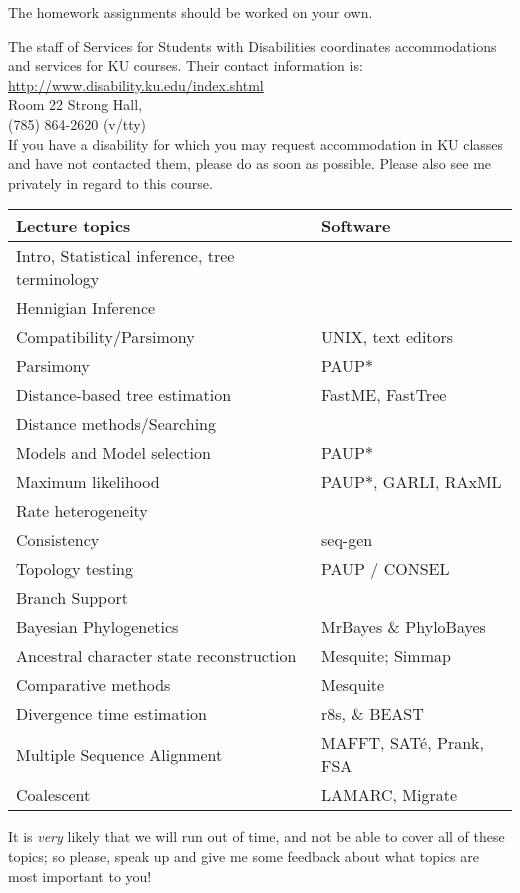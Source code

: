 \documentclass[11pt]{article}
\begin{document}
The homework assignments should be worked on your own. 

\newpage
{}\par
The staff of Services for Students with Disabilities coordinates accommodations and services for KU courses. Their contact information is:\\ 
\url{http://www.disability.ku.edu/index.shtml}\\
Room 22 Strong Hall,  \\
(785) 864-2620 (v/tty) \\ 
If you have a disability for which you may request accommodation in KU classes and have not contacted them, please do as soon as possible. 
Please also see me privately in regard to this course. 
 
\begin{table}[h]
\begin{center}
\begin{tabular}{|l|p{1.9in}|}
\hline
 {\bf Lecture topics} & {\bf Software} \\
\hline
Intro,  Statistical inference, tree terminology & \\
\hline
Hennigian Inference & \\
\hline
Compatibility/Parsimony & UNIX, text editors \\
\hline
Parsimony & PAUP$\ast$\\
\hline
Distance-based tree estimation & FastME, FastTree \\
\hline
Distance methods/Searching & \\
\hline
Models and Model selection & PAUP$\ast$\\
\hline
Maximum likelihood & PAUP$\ast$, GARLI, RAxML \\
\hline
Rate heterogeneity & \\
\hline 
Consistency & seq-gen \\
\hline
Topology testing & PAUP / CONSEL \\
\hline
Branch Support &  \\
\hline
Bayesian Phylogenetics & MrBayes \& PhyloBayes \\
\hline
 Ancestral character state reconstruction & Mesquite; Simmap \\
\hline
Comparative methods & Mesquite \\
\hline
Divergence time estimation & r8s, \& BEAST \\
\hline
Multiple Sequence Alignment & MAFFT, SAT\'e, Prank, FSA\\
\hline
Coalescent & LAMARC, Migrate\\
\hline
\end{tabular}
\end{center}
\label{default}
\end{table}%

It is {\em very} likely that we will run out of time, and not be able to cover all of these topics; so please, speak up and give me some feedback about what topics are most important to you!
\end{document}
